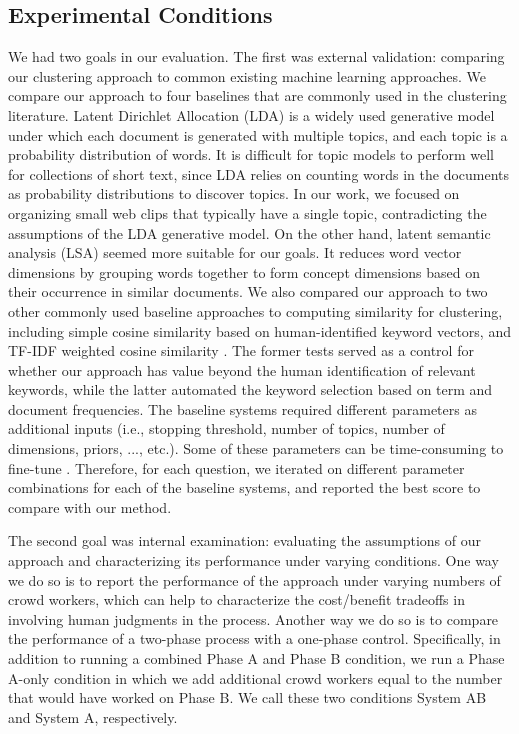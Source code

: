 \subsection{Experimental Conditions}
We had two goals in our evaluation.  The first was external validation:
comparing our clustering approach to common existing machine learning
approaches. We compare our approach to four baselines that are commonly used in
the clustering literature.  Latent Dirichlet Allocation (LDA)
\cite{blei2003latent} is a widely used generative model under which each
document is generated with multiple topics, and each topic is a probability
distribution of words.  It is difficult for topic models to perform well for
collections of short text, since LDA relies on counting words in the documents
as probability distributions to discover topics. In our work, we focused on
organizing small web clips that typically have a single topic, contradicting
the assumptions of the LDA generative model. On the other hand, latent semantic
analysis (LSA) \cite{deerwester1990indexing} seemed more suitable for our goals.
It reduces word vector dimensions by grouping words together to form concept
dimensions based on their occurrence in similar documents. We also compared our
approach to two other commonly used baseline approaches to computing similarity
for clustering, including simple cosine similarity based on human-identified
keyword vectors, and TF-IDF weighted cosine similarity
\cite{manning2008introduction,Jones72astatistical}. The former tests served as
a control for whether our approach has value beyond the human identification of
relevant keywords, while the latter automated the keyword selection based on
term and document frequencies. The baseline systems required different
parameters as additional inputs (i.e., stopping threshold, number of topics,
number of dimensions, priors, ..., etc.).  Some of these parameters can be
time-consuming to fine-tune \cite{chuang2012termite}.  Therefore, for each
question, we iterated on different parameter combinations for each of the
baseline systems, and reported the best score to compare with our method.


The second goal was internal examination: evaluating the assumptions of our
approach and characterizing its performance under varying conditions. One way we
do so is to report the performance of the approach under varying numbers of crowd workers,
which can help to characterize the cost/benefit tradeoffs in involving human judgments
in the process. Another way we do so is to compare the performance of a two-phase process
with a one-phase control. Specifically, in addition to running a combined Phase A and Phase B condition, we run a Phase A-only condition in which we add additional crowd workers equal
to the number that would have worked on Phase B.  We call these two conditions System AB and System A, respectively.

